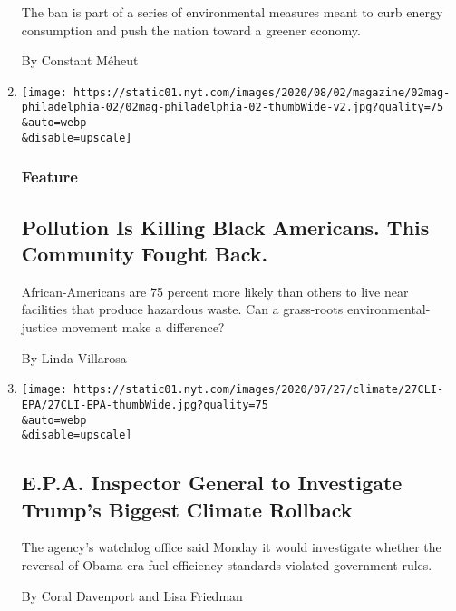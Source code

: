 \begin{enumerate}
  The ban is part of a series of environmental measures meant to curb
  energy consumption and push the nation toward a greener economy.

  By Constant Méheut
\item
  \href{/2020/07/28/magazine/pollution-philadelphia-black-americans.html}{}

  \texttt{[image: https://static01.nyt.com/images/2020/08/02/magazine/02mag-philadelphia-02/02mag-philadelphia-02-thumbWide-v2.jpg?quality=75\\\&auto=webp\\\&disable=upscale]}

  \hypertarget{feature}{%
  \subsubsection{Feature}\label{feature}}

  \hypertarget{pollution-is-killing-black-americans-this-community-fought-back}{%
  \subsection{Pollution Is Killing Black Americans. This Community
  Fought
  Back.}\label{pollution-is-killing-black-americans-this-community-fought-back}}

  African-Americans are 75 percent more likely than others to live near
  facilities that produce hazardous waste. Can a grass-roots
  environmental-justice movement make a difference?

  By Linda Villarosa
\item
  \href{/2020/07/27/climate/trump-fuel-efficiency-rule.html}{}

  \texttt{[image: https://static01.nyt.com/images/2020/07/27/climate/27CLI-EPA/27CLI-EPA-thumbWide.jpg?quality=75\\\&auto=webp\\\&disable=upscale]}

  \hypertarget{epa-inspector-general-to-investigate-trumps-biggest-climate-rollback}{%
  \subsection{E.P.A. Inspector General to Investigate Trump's Biggest
  Climate
  Rollback}\label{epa-inspector-general-to-investigate-trumps-biggest-climate-rollback}}

  The agency's watchdog office said Monday it would investigate whether
  the reversal of Obama-era fuel efficiency standards violated
  government rules.

  By Coral Davenport and Lisa Friedman
\end{enumerate}

